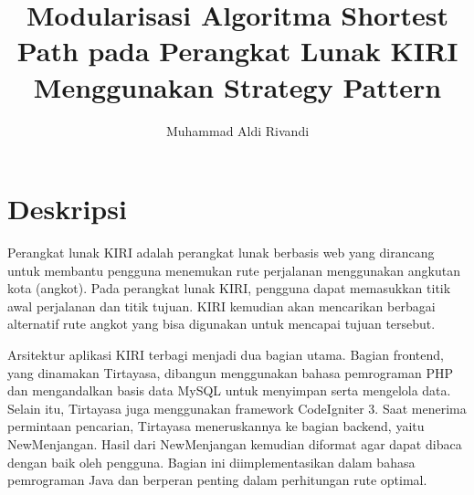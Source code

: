 \documentclass[a4paper,twoside]{article}
\begin{document}
	
	\title{Modularisasi Algoritma Shortest Path pada Perangkat Lunak KIRI Menggunakan Strategy Pattern}
        \author{Muhammad Aldi Rivandi } 
	
	\newcommand{\nama}{Muhammad Aldi Rivandi}
	\newcommand{\@npm}{6182001029}
	\newcommand{\@judultopik}{Modularisasi Algoritma Shortest Path pada Perangkat Lunak KIRI Menggunakan Strategy Pattern} %
	\newcommand{\jumpemb}{1} %
	\newcommand{\tanggal}{17/09/2024}
	
	
	\maketitle
	
	
	\section{Deskripsi}
	Perangkat lunak KIRI adalah perangkat lunak berbasis web yang dirancang untuk membantu pengguna menemukan rute perjalanan menggunakan angkutan kota (angkot). Pada perangkat lunak KIRI, pengguna dapat memasukkan titik awal perjalanan dan titik tujuan. KIRI kemudian akan mencarikan berbagai alternatif rute angkot yang bisa digunakan untuk mencapai tujuan tersebut.
	
	Arsitektur aplikasi KIRI terbagi menjadi dua bagian utama. Bagian frontend, yang dinamakan Tirtayasa, dibangun menggunakan bahasa pemrograman PHP dan mengandalkan basis data MySQL untuk menyimpan serta mengelola data. Selain itu, Tirtayasa juga menggunakan framework CodeIgniter 3. Saat menerima permintaan pencarian, Tirtayasa meneruskannya ke bagian backend, yaitu NewMenjangan. Hasil dari NewMenjangan kemudian diformat agar dapat dibaca dengan baik oleh pengguna. Bagian ini diimplementasikan dalam bahasa pemrograman Java dan berperan penting dalam perhitungan rute optimal.
\end{document}
